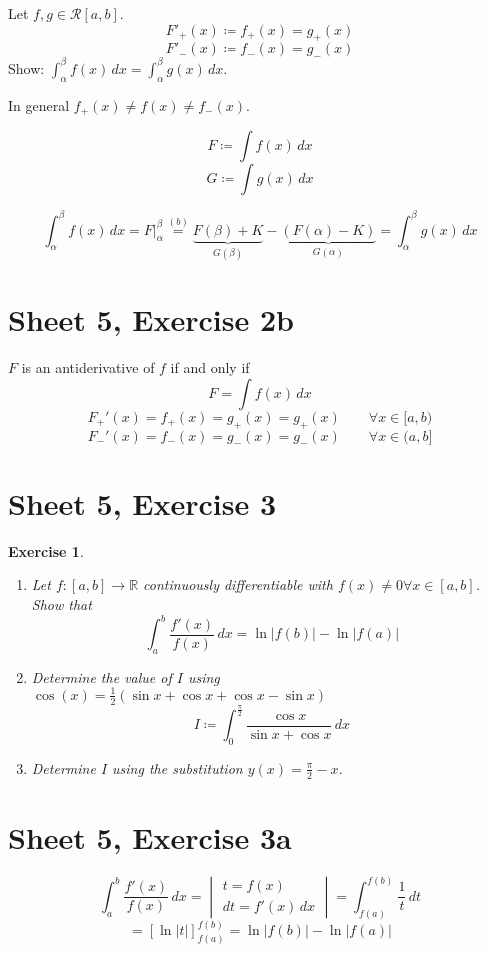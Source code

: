 \documentclass{article}
\newtheorem{ex}{Exercise} %
\newcommand{\card}[1]{\left|#1\right|}
\begin{document}
Let $f,g \in \mathcal R[a,b]$.
\[ F'_+(x) \coloneqq f_+(x) = g_+(x) \]
\[ F'_-(x) \coloneqq f_-(x) = g_-(x) \]
Show: $\int_\alpha^\beta f(x) \, dx = \int_\alpha^\beta g(x) \, dx$.

In general $f_+(x) \neq f(x) \neq f_-(x)$.

\[ F \coloneqq \int f(x) \, dx \]
\[ G \coloneqq \int g(x) \, dx \]

\[ \int_\alpha^\beta f(x) \, dx = \left. F \right|_\alpha^\beta \overset{(b)}{=} \underbrace{F(\beta) + K}_{G(\beta)} - \underbrace{(F(\alpha) - K)}_{G(\alpha)} = \int_\alpha^\beta g(x) \, dx \]

\section{Sheet 5, Exercise 2b}
$F$ is an antiderivative of $f$ if and only if
\[ F = \int f(x) \, dx \]
\[ F_+'(x) = f_+(x) = g_+(x) = g_+(x) \qquad \forall x \in [a,b) \]
\[ F_-'(x) = f_-(x) = g_-(x) = g_-(x) \qquad \forall x \in (a,b] \]

\section{Sheet 5, Exercise 3}
\begin{ex}
  \begin{enumerate}
    \item Let $f: [a,b] \to \mathbb R$ continuously differentiable with $f(x) \neq 0 \forall x \in [a,b]$. Show that
      \[ \int_a^b \frac{f'(x)}{f(x)} \, dx = \ln{\card{f(b)}} - \ln{\card{f(a)}} \]
    \item Determine the value of $I$ using $\cos(x) = \frac12 (\sin{x} + \cos{x} + \cos{x} - \sin{x})$
      \[ I \coloneqq \int_0^{\frac\pi2} \frac{\cos{x}}{\sin{x} + \cos{x}} \, dx \]
    \item Determine $I$ using the substitution $y(x) = \frac\pi2 - x$.
  \end{enumerate}
\end{ex}

\section{Sheet 5, Exercise 3a}
\[ \int_a^b \frac{f'(x)}{f(x)} \, dx = \begin{vmatrix} t = f(x) \\ dt = f'(x) \, dx \end{vmatrix} = \int_{f(a)}^{f(b)} \frac{1}{t} \, dt \]
\[ = \left[\ln\card{t}\right]_{f(a)}^{f(b)} = \ln\card{f(b)} - \ln\card{f(a)} \]
\end{document}
